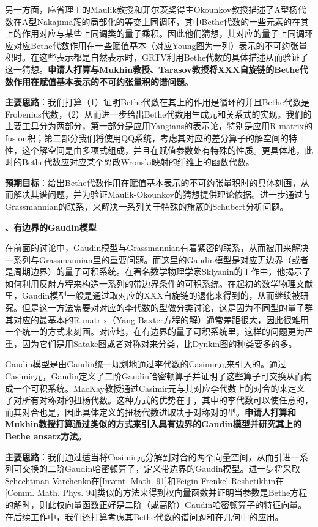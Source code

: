 \documentclass[12pt,UTF8,AutoFakeBold=4,a4paper]{ctexart}
\begin{document}
另一方面，麻省理工的Maulik教授和菲尔茨奖得主Okounkov教授描述了A型杨代数在A型Nakajima簇的局部化的等变上同调环，其中Bethe代数的一些元素的在其上的作用对应与某些上同调类的量子乘积。因此他们猜想，其对应的量子上同调环应对应Bethe代数作用在一些赋值基本（对应Young图为一列）表示的不可约张量积时。在这些表示都是自然表示时，GRTV利用Bethe代数的具体描述从而验证了这一猜想。\textbf{申请人打算与Mukhin教授、Tarasov教授将XXX自旋链的Bethe代数作用在赋值基本表示的不可约张量积的谱问题}。

\textbf{主要思路}：我们打算（1）证明Bethe代数在其上的作用是循环的并且Bethe代数是Frobenius代数，（2）从而进一步给出Bethe代数用生成元和关系式的实现。我们的主要工具分为两部分，第一部分是应用Yangians的表示论，特别是应用R-matrix的fusion积；第二部分我们将使用QQ系统，考虑其对应的差分算子的解空间的特性，这个解空间是由多项式组成，并且在赋值参数处有特殊的性质。更具体地，此时的Bethe代数应对应某个离散Wronski映射的纤维上的函数代数。

\textbf{预期目标}：给出Bethe代数作用在赋值基本表示的不可约张量积时的具体刻画，从而解决其谱问题，并为验证Maulik-Okounkov的猜想提供理论依据。进一步通过与Grassmannian的联系，来解决一系列关于特殊的旗簇的Schubert分析问题。

\medskip

\textbf{、有边界的Gaudin模型}

在前面的讨论中，Gaudin模型与Grassmannian有着紧密的联系，从而被用来解决一系列与Grassmannian里的重要问题。而这里的Gaudin模型是对应无边界（或者是周期边界）的量子可积系统。在著名数学物理学家Sklyanin的工作中，他揭示了如何利用反射方程来构造一系列的带边界条件的可积系统。在起初的数学物理文献里，Gaudin模型一般是通过取对应的XXX自旋链的退化来得到的，从而继续被研究。但是这一方法需要对对应的李代数的型做分类讨论，这是因为不同型的量子群其对应的最基本的R-matrix（Yang-Baxter方程的解）通常差距很大，因此很难用一个统一的方式来刻画。对应地，在有边界的量子可积系统里，这样的问题更为严重，因为它们是用Satake图或者对称对来分类，比Dynkin图的种类要多的多。

Gaudin模型是由Gaudin统一规划地通过李代数的Casimir元来引入的。通过Casimir元，Gaudin定义了二阶Gaudin哈密顿算子并证明了这些算子可交换从而构成一个可积系统。MacKay教授通过Casimir元与其对应李代数上的对合的来定义了对所有对称对的扭杨代数。这种方式的优势在于，其中的李代数可以使任意的，而其对合也是，因此具体定义的扭杨代数进取决于对称对的型。\textbf{申请人打算和Mukhin教授打算通过类似的方式来引入具有边界的Gaudin模型并研究其上的Bethe ansatz方法}。

\textbf{主要思路}：我们通过适当将Casimir元分解到对合的两个向量空间，从而引进一系列可交换的二阶Gaudin哈密顿算子，定义带边界的Gaudin模型。进一步将采取Schechtman-Varchenko在[Invent. Math. 91]和Feigin-Frenkel-Reshetikhin在[Comm. Math. Phys. 94]类似的方法来得到权向量函数并证明当参数是Bethe方程的解时，则此权向量函数正好是二阶（或高阶）Gaudin哈密顿算子的特征向量。在后续工作中，我们还打算考虑其Bethe代数的谱问题和在几何中的应用。
\end{document}
